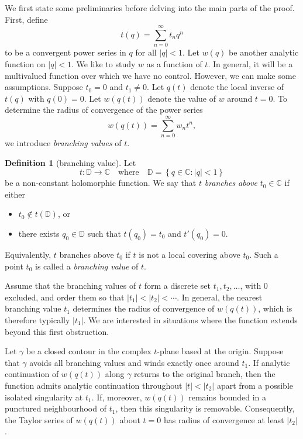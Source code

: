 \documentclass[12pt, a4paper]{amsart}
\theoremstyle{definition}
\numberwithin{theorem}{section}
\newtheorem{definition}[theorem]{Definition}
\begin{document}
We first state some preliminaries before delving into the main parts of the proof. First, define \[t\left(q\right)=\sum_{n=0}^{\infty}t_nq^n\] to be a convergent power series in $q$ for all $\left|q\right|<1$. Let $w\left(q\right)$ be another analytic function on $\left|q\right|<1$. We like to study $w$ as a function of $t$. In general, it will be a multivalued function over which we have no control. However, we can make some assumptions. Suppose $t_0=0$ and $t_1\ne 0$. Let $q\left(t\right)$ denote the local inverse of $t\left(q\right)$ with $q\left(0\right)=0$. Let $w\left(q\left(t\right)\right)$ denote the value of $w$ around $t=0$. To determine the radius of convergence of the power series \[w\left(q\left(t\right)\right)=\sum_{n=0}^{\infty}w_nt^n,\]
we introduce \emph{branching values} of $t$.
\begin{definition}[branching value] Let
\[
t:\mathbb{D}\rightarrow\mathbb{C}
\quad\text{where}\quad \mathbb{D}=\left\{q\in\mathbb{C}:\left|q\right|<1\right\}
\]
be a non-constant holomorphic function. We say that \(t\) \emph{branches above} \(t_0\in\mathbb{C}\) if either
\begin{itemize}
\itemsep 0em
    \item \(t_0\notin t\left(\mathbb{D}\right)\), or
    \item there exists \(q_0\in\mathbb{D}\) such that $t\left(q_0\right)=t_0$ and $t'\left(q_0\right)=0$.
\end{itemize}
Equivalently, \(t\) branches above \(t_0\) if \(t\) is not a local covering above \(t_0\). Such a point \(t_0\) is called a \emph{branching value} of \(t\).
\end{definition}
Assume that the branching values of \(t\) form a discrete set $t_1,t_2,\ldots$, with \(0\) excluded, and order them so that $\left|t_1\right|<\left|t_2\right|<\cdots$. In general, the nearest branching value \(t_1\) determines the radius of convergence of \(w\left(q\left(t\right)\right)\), which is therefore typically \(\left|t_1\right|\). We are interested in situations where the function extends beyond this first obstruction.

Let \(\gamma\) be a closed contour in the complex \(t\)-plane based at the origin. Suppose that \(\gamma\) avoids all branching values and winds exactly once around \(t_1\). If analytic continuation of \(w\left(q\left(t\right)\right)\) along \(\gamma\) returns to the original branch, then the function admits analytic continuation throughout $\left|t\right|<\left|t_2\right|$ apart from a possible isolated singularity at \(t_1\). If, moreover, \(w\left(q\left(t\right)\right)\) remains bounded in a punctured neighbourhood of \(t_1\), then this singularity is removable. Consequently, the Taylor series of \(w\left(q\left(t\right)\right)\) about \(t=0\) has radius of convergence at least \(\left|t_2\right|\).
\end{document}
